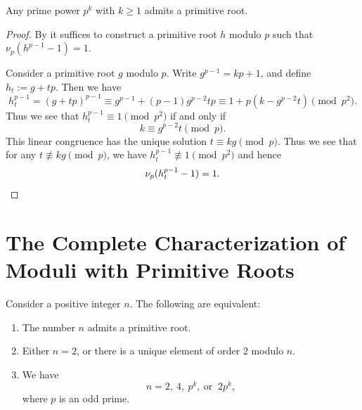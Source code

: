 \begin{theorem}\label{theorem:primitive-roots-odd-prime-powers}
  Any prime power $p^k$ with $k\geq 1$ admits a primitive root.
\end{theorem}

\begin{proof}
  By  it suffices to construct a primitive root $h$ modulo $p$ such that $\nu_p(h^{p-1}-1)=1$.

  Consider a primitive root $g$ modulo $p$. Write $g^{p-1}=kp+1$, and define $h_t:=g+tp$. Then we have
  \begin{equation*}
    h_t^{p-1}=(g+tp)^{p-1}\equiv g^{p-1}+(p-1)g^{p-2}tp\equiv 1+p(k-g^{p-2}t) \pmod{p^2}.
  \end{equation*}
  Thus we see that $h_t^{p-1}\equiv 1\pmod{p^2}$ if and only if
  \begin{equation*}
    k \equiv g^{p-2}t \pmod{p}.
  \end{equation*}
  This linear congruence has the unique solution $t\equiv kg\pmod{p}$. Thus we see that for any $t\nequiv kg\pmod{p}$, we have $h_t^{p-1}\nequiv 1\pmod{p^2}$ and hence
  \begin{equation*}
    \nu_p(h_t^{p-1}-1)=1.\qedhere
  \end{equation*}
\end{proof}

\section{The Complete Characterization of Moduli with Primitive Roots}

\begin{theorem}\label{theorem:moduli-with-primitive-roots}
  Consider a positive integer $n$. The following are equivalent:
  \begin{enumerate}
  \item \label{itemi:classification-primitive-roots}The number $n$ admits a primitive root.
  \item \label{itemii:classification-primitive-roots}Either $n=2$, or there is a unique element of order $2$ modulo $n$.
  \item \label{itemiii:classification-primitive-roots}We have
  \begin{equation*}
    n=2,~4,~p^k,~\text{or }~2p^k,
  \end{equation*}
  where $p$ is an odd prime.
  \end{enumerate}
\end{theorem}


